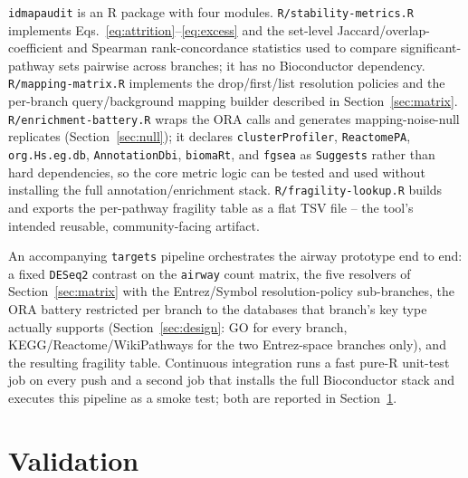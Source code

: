 \documentclass[webpdf,contemporary,large]{oup-authoring-template}
\theoremstyle{thmstyleone}%
\theoremstyle{thmstyletwo}%
\theoremstyle{thmstylethree}%
\begin{document}
\texttt{idmapaudit} is an R package with four modules. \texttt{R/stability-metrics.R} implements Eqs.~\ref{eq:attrition}--\ref{eq:excess} and the set-level Jaccard/overlap-coefficient and Spearman rank-concordance statistics used to compare significant-pathway sets pairwise across branches; it has no Bioconductor dependency. \texttt{R/mapping-matrix.R} implements the drop/first/list resolution policies and the per-branch query/background mapping builder described in Section~\ref{sec:matrix}. \texttt{R/enrichment-battery.R} wraps the ORA calls and generates mapping-noise-null replicates (Section~\ref{sec:null}); it declares \texttt{clusterProfiler}, \texttt{ReactomePA}, \texttt{org.Hs.eg.db}, \texttt{AnnotationDbi}, \texttt{biomaRt}, and \texttt{fgsea} as \texttt{Suggests} rather than hard dependencies, so the core metric logic can be tested and used without installing the full annotation/enrichment stack. \texttt{R/fragility-lookup.R} builds and exports the per-pathway fragility table as a flat TSV file -- the tool's intended reusable, community-facing artifact.

An accompanying \texttt{targets} pipeline \citep{landau2021targets} orchestrates the airway prototype end to end: a fixed \texttt{DESeq2} contrast on the \texttt{airway} \citep{morgan2020summarizedexperiment,himes2014rnaseq} count matrix, the five resolvers of Section~\ref{sec:matrix} with the Entrez/Symbol resolution-policy sub-branches, the ORA battery restricted per branch to the databases that branch's key type actually supports (Section~\ref{sec:design}: GO for every branch, KEGG/Reactome/WikiPathways for the two Entrez-space branches only), and the resulting fragility table. Continuous integration runs a fast pure-R unit-test job on every push and a second job that installs the full Bioconductor stack and executes this pipeline as a smoke test; both are reported in Section~\ref{sec:validation}.

\section{Validation}\label{sec:validation}
\end{document}
